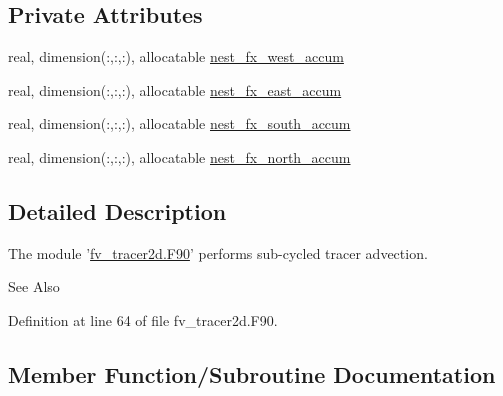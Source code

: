 \subsection*{Private Attributes}
\begin{DoxyCompactItemize}
\item 
real, dimension(\-:,\-:,\-:), allocatable \hyperlink{classfv__tracer2d__mod_afedafbd659d48b128ce6461b3483b85a}{nest\-\_\-fx\-\_\-west\-\_\-accum}
\item 
real, dimension(\-:,\-:,\-:), allocatable \hyperlink{classfv__tracer2d__mod_a2ef2686b07c3eae1d4f5f17a3db8e8e8}{nest\-\_\-fx\-\_\-east\-\_\-accum}
\item 
real, dimension(\-:,\-:,\-:), allocatable \hyperlink{classfv__tracer2d__mod_a3bf4ea79bede8504fd2df61b9837991c}{nest\-\_\-fx\-\_\-south\-\_\-accum}
\item 
real, dimension(\-:,\-:,\-:), allocatable \hyperlink{classfv__tracer2d__mod_a9616f908472d3cd36e6e3ed3ac287ed5}{nest\-\_\-fx\-\_\-north\-\_\-accum}
\end{DoxyCompactItemize}


\subsection{Detailed Description}
The module '\hyperlink{fv__tracer2d_8F90}{fv\-\_\-tracer2d.\-F90}' performs sub-\/cycled tracer advection. 

\begin{DoxySeeAlso}{See Also}
\cite{lin2004vertically} 
\end{DoxySeeAlso}


Definition at line 64 of file fv\-\_\-tracer2d.\-F90.



\subsection{Member Function/\-Subroutine Documentation}
